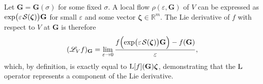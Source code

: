 Let $\mathbf{G} = \mathbf{G}(\sigma)$ for some fixed $\sigma$. A local flow $\rho(\varepsilon, \mathbf{G})$ of $V$ can be expressed as $\exp\bigl(\varepsilon\SL[\boldsymbol{\zeta}]\bigr)\mathbf{G}$ for small $\varepsilon$ and some vector $\boldsymbol{\zeta}\in\mathbb{R}^m$. The Lie derivative of $f$ with respect to $V$ at $\mathbf{G}$ is therefore
\begin{align}
    (\mathscr{L}_V f)_{\mathbf{G}} = \lim_{\varepsilon \to 0 }\frac{f\Bigl(\exp\bigl(\varepsilon\SL[\boldsymbol{\zeta}]\bigr)\mathbf{G}\Bigr) - f(\mathbf{G})}{\varepsilon},
\end{align}
which, by definition, is exactly equal to $\operatorname{L}[f](\mathbf{G})\boldsymbol{\zeta}$, demonstrating that the $\operatorname{L}$ operator represents a component of the Lie derivative.